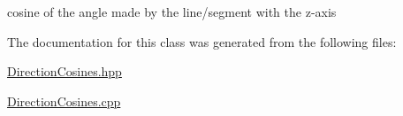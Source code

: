 cosine of the angle made by the line/segment with the z-\/axis 



The documentation for this class was generated from the following files\+:\begin{DoxyCompactItemize}
\item 
\mbox{\hyperlink{_direction_cosines_8hpp}{Direction\+Cosines.\+hpp}}\item 
\mbox{\hyperlink{_direction_cosines_8cpp}{Direction\+Cosines.\+cpp}}\end{DoxyCompactItemize}
